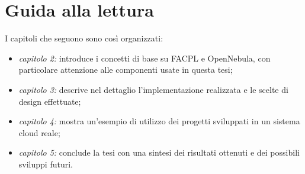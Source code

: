 \section{Guida alla lettura}
I capitoli che seguono sono così organizzati:
\begin{itemize}
    \item \emph{capitolo 2:} introduce i concetti di base su FACPL e OpenNebula, con particolare attenzione alle componenti usate in questa tesi;
    \item \emph{capitolo 3:} descrive nel dettaglio l'implementazione realizzata e le scelte di design effettuate;
    \item \emph{capitolo 4:} mostra un'esempio di utilizzo dei progetti sviluppati in un sistema cloud reale;
    \item \emph{capitolo 5:} conclude la tesi con una sintesi dei risultati ottenuti e dei possibili sviluppi futuri.
\end{itemize}